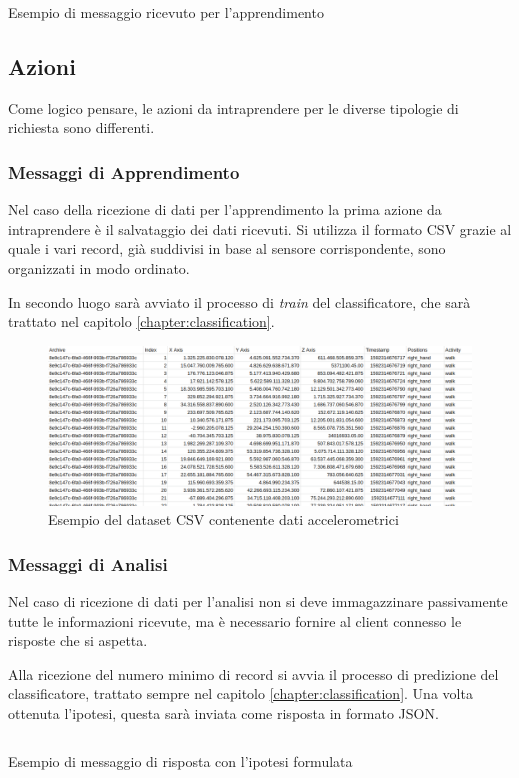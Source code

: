 \begin{listing}[H] 
    \inputminted[frame=single,framesep=10pt]{json}{assets/snippets/server/receiver/message.json}
    \caption{Esempio di messaggio ricevuto per l'apprendimento}
    \label{code:example-message-learning}
\end{listing}

\newpage
\subsection{Azioni}
Come logico pensare, le azioni da intraprendere per le diverse tipologie di richiesta sono differenti. 

\subsubsection{Messaggi di Apprendimento}
Nel caso della ricezione di dati per l'apprendimento la prima azione da intraprendere è il salvataggio dei dati ricevuti.
Si utilizza il formato CSV grazie al quale i vari record, già suddivisi in base al sensore corrispondente, sono organizzati in modo ordinato. 

In secondo luogo sarà avviato il processo di \textit{train} del classificatore, che sarà trattato nel capitolo \ref{chapter:classification}.
\begin{figure}[H]
    \centering
    \includegraphics[scale = 0.39]{assets/images/examples/dataset-data-example.png}
    \caption{Esempio del dataset CSV contenente dati accelerometrici}
    \label{fig:example-dataset-csv-accelerometer}
\end{figure}


\subsubsection{Messaggi di Analisi}
Nel caso di ricezione di dati per l'analisi non si deve immagazzinare passivamente tutte le informazioni ricevute, ma è necessario fornire
al client connesso le risposte che si aspetta.

Alla ricezione del numero minimo di record si avvia il processo di predizione del classificatore, trattato sempre nel capitolo \ref{chapter:classification}.
Una volta ottenuta l'ipotesi, questa sarà inviata come risposta in formato JSON.

\begin{listing}[H] 
    \inputminted[frame=single,framesep=10pt]{json}{assets/snippets/server/receiver/prediction.json}
    \caption{Esempio di messaggio di risposta con l'ipotesi formulata}
\end{listing}